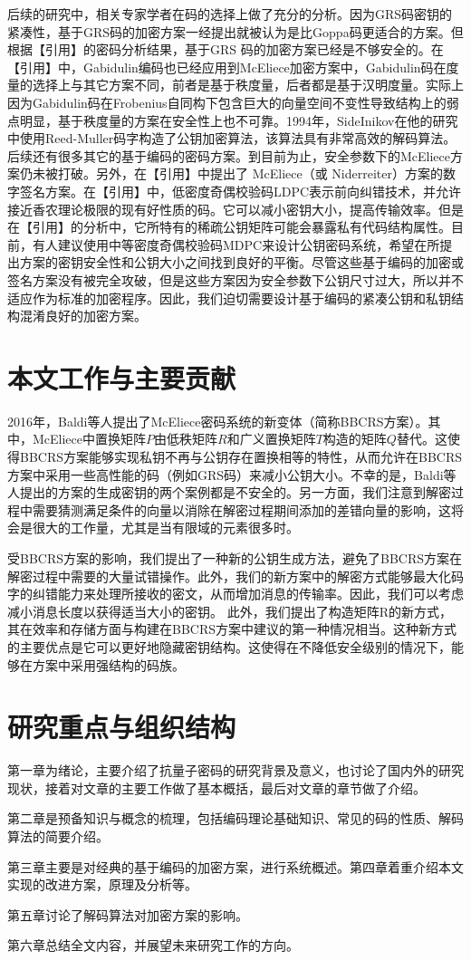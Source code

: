 后续的研究中，相关专家学者在码的选择上做了充分的分析。因为GRS码密钥的紧凑性，基于GRS码的加密方案一经提出就被认为是比Goppa码更适合的方案。但根据【引用】的密码分析结果，基于GRS 码的加密方案已经是不够安全的。在【引用】中，Gabidulin编码也已经应用到McEliece加密方案中，Gabidulin码在度量的选择上与其它方案不同，前者是基于秩度量，后者都是基于汉明度量。实际上因为Gabidulin码在Frobenius自同构下包含巨大的向量空间不变性导致结构上的弱点明显，基于秩度量的方案在安全性上也不可靠。1994年，SideInikov在他的研究中使用Reed-Muller码字构造了公钥加密算法，该算法具有非常高效的解码算法。后续还有很多其它的基于编码的密码方案。到目前为止，安全参数下的McEliece方案仍未被打破。另外，在【引用】中提出了 McEliece（或 Niderreiter）方案的数字签名方案。在【引用】中，低密度奇偶校验码LDPC表示前向纠错技术，并允许接近香农理论极限的现有好性质的码。它可以减小密钥大小，提高传输效率。但是在【引用】的分析中，它所特有的稀疏公钥矩阵可能会暴露私有代码结构属性。目前，有人建议使用中等密度奇偶校验码MDPC来设计公钥密码系统，希望在所提出方案的密钥安全性和公钥大小之间找到良好的平衡。尽管这些基于编码的加密或签名方案没有被完全攻破，但是这些方案因为安全参数下公钥尺寸过大，所以并不适应作为标准的加密程序。因此，我们迫切需要设计基于编码的紧凑公钥和私钥结构混淆良好的加密方案。

\section{本文工作与主要贡献}
2016年，Baldi等人提出了McEliece密码系统的新变体（简称BBCRS方案）。其中，McEliece中置换矩阵$P$由低秩矩阵$R$和广义置换矩阵$T$构造的矩阵$Q$替代。这使得BBCRS方案能够实现私钥不再与公钥存在置换相等的特性，从而允许在BBCRS方案中采用一些高性能的码（例如GRS码）来减小公钥大小。不幸的是，Baldi等人提出的方案的生成密钥的两个案例都是不安全的。另一方面，我们注意到解密过程中需要猜测满足条件的向量以消除在解密过程期间添加的差错向量的影响，这将会是很大的工作量，尤其是当有限域的元素很多时。

受BBCRS方案的影响，我们提出了一种新的公钥生成方法，避免了BBCRS方案在解密过程中需要的大量试错操作。此外，我们的新方案中的解密方式能够最大化码字的纠错能力来处理所接收的密文，从而增加消息的传输率。因此，我们可以考虑减小消息长度以获得适当大小的密钥。 此外，我们提出了构造矩阵R的新方式，其在效率和存储方面与构建在BBCRS方案中建议的第一种情况相当。这种新方式的主要优点是它可以更好地隐藏密钥结构。这使得在不降低安全级别的情况下，能够在方案中采用强结构的码族。

\section{研究重点与组织结构}
第一章为绪论，主要介绍了抗量子密码的研究背景及意义，也讨论了国内外的研究现状，接着对文章的主要工作做了基本概括，最后对文章的章节做了介绍。

第二章是预备知识与概念的梳理，包括编码理论基础知识、常见的码的性质、解码算法的简要介绍。

第三章主要是对经典的基于编码的加密方案，进行系统概述。第四章着重介绍本文实现的改进方案，原理及分析等。

第五章讨论了解码算法对加密方案的影响。

第六章总结全文内容，并展望未来研究工作的方向。




